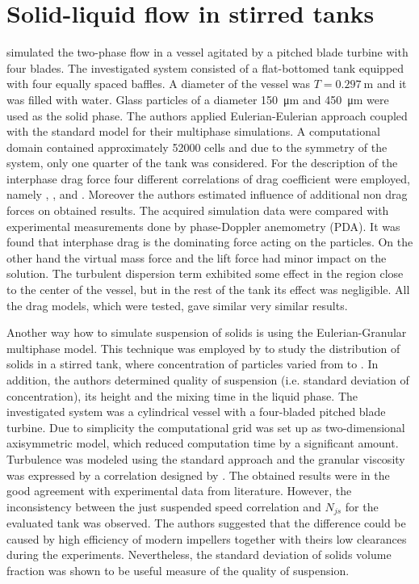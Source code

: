\section{Solid-liquid flow in stirred tanks}
\citet{lju01} simulated the two-phase flow in a vessel agitated by a pitched blade turbine with four blades. The investigated system consisted of a flat-bottomed tank equipped with four equally spaced baffles. A diameter of the vessel was $T=\SI{0.297}{\meter}$ and it was filled with water. Glass particles of a diameter \SI{150}{\micro\meter} and \SI{450}{\micro\meter} were used as the solid phase. The authors applied Eulerian-Eulerian approach coupled with the standard \keps{} model for their multiphase simulations. A computational domain contained approximately \num{52000} cells and due to the symmetry of the system, only one quarter of the tank was considered. For the description of the interphase drag force four different correlations of drag coefficient were employed, namely \citet{schi32}, \citet{ish79}, \citet{ihme72} and \citet{bru98}. Moreover the authors estimated influence of additional non drag forces on obtained results. The acquired simulation data were compared with experimental measurements done by phase-Doppler anemometry (PDA). It was found that interphase drag is the dominating force acting on the particles. On the other hand the virtual mass force and the lift force had minor impact on the solution. The turbulent dispersion term exhibited some effect in the region close to the center of the vessel, but in the rest of the tank its effect was negligible. All the drag models, which were tested, gave similar very similar results.

Another way how to simulate suspension of solids is using the Eulerian-Granular multiphase model. This technique was employed by \citet{oshi02} to study the distribution of solids in a stirred tank, where concentration of particles varied from  to . In addition, the authors determined quality of suspension (i.e. standard deviation of concentration), its height and the mixing time in the liquid phase. The investigated system was a cylindrical vessel with a four-bladed pitched blade turbine. Due to simplicity the computational grid was set up as two-dimensional axisymmetric model, which reduced computation time by a significant amount. Turbulence was modeled using the standard \keps{} approach and the granular viscosity was expressed by a correlation designed by \citet{syam93}. The obtained results were in the good agreement with experimental data from literature. However, the inconsistency between the just suspended speed correlation and $N_{js}$ for the evaluated tank was observed. The authors suggested that the difference could be caused by high efficiency of modern impellers together with theirs low clearances during the experiments. Nevertheless, the standard deviation of solids volume fraction was shown to be useful measure of the quality of suspension. 

  



